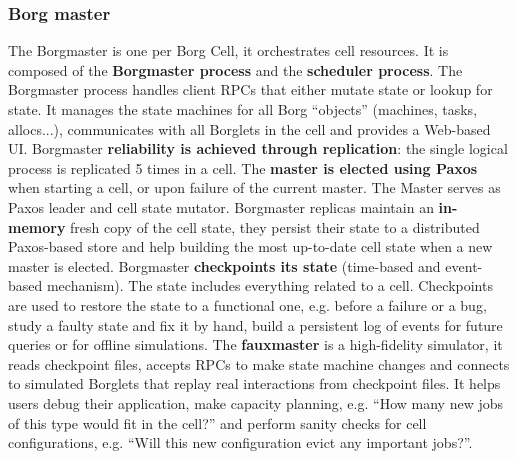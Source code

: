 		\subsubsection{Borg master}
		The Borgmaster is one per Borg Cell, it orchestrates cell resources. It is composed of the \textbf{Borgmaster process} and the \textbf{scheduler process}.\newline
		The Borgmaster process handles client RPCs that either mutate state or lookup for state. It manages the state machines for all Borg “objects” (machines, tasks, allocs...), communicates with all Borglets in the cell and provides a Web-based UI.\newline
		\newline
		Borgmaster \textbf{reliability is achieved through replication}: the single logical process is replicated 5 times in a cell. The \textbf{master is elected using Paxos} when starting a cell, or upon failure of the current master. The Master serves as Paxos leader and cell state mutator.\newline
		Borgmaster replicas maintain an \textbf{in-memory} fresh copy of the cell state, they persist their state to a distributed Paxos-based store and help building the most up-to-date cell state when a new master is elected.\newline
		\newline
		Borgmaster \textbf{checkpoints its state} (time-based and event-based mechanism). The state includes everything related to a cell.\newline
		Checkpoints are used to restore the state to a functional one, e.g. before a failure or a bug, study a faulty state and fix it by hand, build a persistent log of events for future queries or for offline simulations.\newline
		\newline
		The \textbf{fauxmaster} is a high-fidelity simulator, it reads checkpoint files, accepts RPCs to make state machine changes and connects to simulated Borglets that replay real interactions from checkpoint files.\newline
		It helps users debug their application, make capacity planning, e.g. “How many new jobs of this type would fit in the cell?” and perform sanity checks for cell configurations, e.g. “Will this new configuration evict any important jobs?”.
